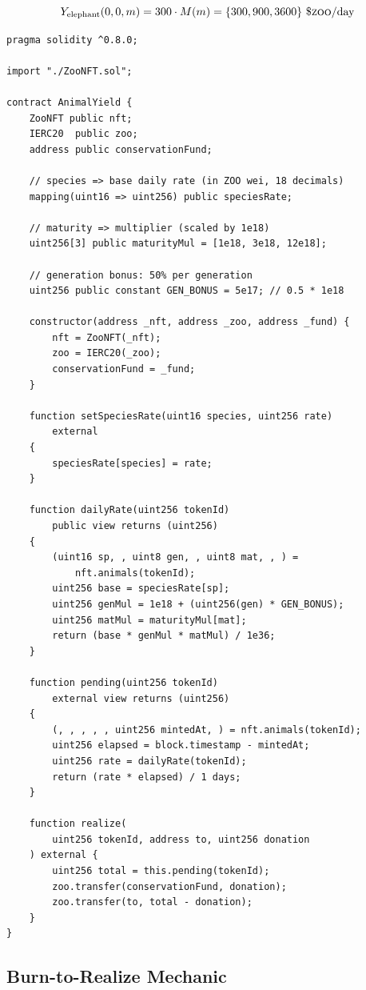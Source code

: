 \documentclass[11pt,letterpaper]{article}
\newcommand{\ZOO}{\$\textsc{zoo}}
\begin{document}
\begin{equation}
Y_{\text{elephant}}(0, 0, m) = 300 \cdot M(m) = \{300, 900, 3600\} \text{ \ZOO{}/day}
\end{equation}

\begin{lstlisting}[language=Solidity,caption={AnimalYield: per-rarity rate oracle}]
pragma solidity ^0.8.0;

import "./ZooNFT.sol";

contract AnimalYield {
    ZooNFT public nft;
    IERC20  public zoo;
    address public conservationFund;

    // species => base daily rate (in ZOO wei, 18 decimals)
    mapping(uint16 => uint256) public speciesRate;

    // maturity => multiplier (scaled by 1e18)
    uint256[3] public maturityMul = [1e18, 3e18, 12e18];

    // generation bonus: 50% per generation
    uint256 public constant GEN_BONUS = 5e17; // 0.5 * 1e18

    constructor(address _nft, address _zoo, address _fund) {
        nft = ZooNFT(_nft);
        zoo = IERC20(_zoo);
        conservationFund = _fund;
    }

    function setSpeciesRate(uint16 species, uint256 rate)
        external
    {
        speciesRate[species] = rate;
    }

    function dailyRate(uint256 tokenId)
        public view returns (uint256)
    {
        (uint16 sp, , uint8 gen, , uint8 mat, , ) =
            nft.animals(tokenId);
        uint256 base = speciesRate[sp];
        uint256 genMul = 1e18 + (uint256(gen) * GEN_BONUS);
        uint256 matMul = maturityMul[mat];
        return (base * genMul * matMul) / 1e36;
    }

    function pending(uint256 tokenId)
        external view returns (uint256)
    {
        (, , , , , uint256 mintedAt, ) = nft.animals(tokenId);
        uint256 elapsed = block.timestamp - mintedAt;
        uint256 rate = dailyRate(tokenId);
        return (rate * elapsed) / 1 days;
    }

    function realize(
        uint256 tokenId, address to, uint256 donation
    ) external {
        uint256 total = this.pending(tokenId);
        zoo.transfer(conservationFund, donation);
        zoo.transfer(to, total - donation);
    }
}
\end{lstlisting}

\subsection{Burn-to-Realize Mechanic}
\end{document}
